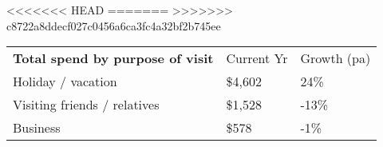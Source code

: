 <<<<<<< HEAD
=======
>>>>>>> c8722a8ddecf027c0456a6ca3fc4a32bf2b745ee
\begin{tabular}[t]{p{5.1cm}>{\hfill}p{1.1cm}>{\hfill}p{1.3cm}}
 \textbf{Total spend by purpose of visit} & Current Yr & Growth (pa) \\ 
 Holiday / vacation & \$4,602 & 24\% \\ 
  Visiting friends / relatives & \$1,528 & -13\% \\ 
  Business & \$578   & -1\% \\ 
  \end{tabular}
